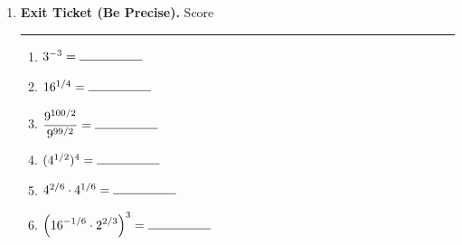 \documentclass[twoside, 10pt]{article}
\begin{document}
\begin{enumerate}
Complete the steps of a proof for the logarithm quotient rule: $\displaystyle \log_b\left(\frac{U}{V}\right) = \log_b{U} - \log_b{V}$. Start with two equations:
\[
b^x = U\hspace{8em}b^y = V
\]
\begin{enumerate}[label = (\roman*)]
\item
Rewrite both of these equations as logarithms.
\begin{align*}
\log_{\rule{2em}{.4pt}}\left(\rule{3em}{0.4pt}\right) &= \rule{4em}{.4pt}\\[1em]
\log_{\rule{2em}{.4pt}}\left(\rule{3em}{0.4pt}\right) &= \rule{4em}{.4pt}
\end{align*}
\item Divide the left sides of the original equations, and set the quotient equal to the quotient of
the right sides of the original equations.
\[
\rule{6em}{0.4pt} = \frac{U}{V}
\]
\item Combine the exponents on the left side of the equation so that it is written with a
single base.
\[
\rule{6em}{0.4pt} = \frac{U}{V}
\]
\item Rewrite the last equation as a logarithm.
\[
\log_{\rule{2em}{.4pt}}\left(\rule{3em}{0.4pt}\right) = \rule{4em}{.4pt}
\]
\item Combine the result in (i) and (iv) to derive the quotient rule of logarithms:\\[1em]
\begin{center}
\rule{20em}{.4pt}
\end{center}
\end{enumerate}
\item {\bf Exit Ticket (Be Precise). } Score \rule{4em}{.4pt}
\begin{enumerate}[itemsep=3em]
\item
$3^{-3} = \rule{5em}{0.4pt}$
\item 
$16^{1/4} = \rule{5em}{0.4pt}$
\item 
$\displaystyle \frac{9^{100/2}}{9^{99/2}} = \rule{5em}{0.4pt}$
\item
$(4^{1/2})^4 = \rule{5em}{0.4pt}$
\item 
$4^{2/6}\cdot4^{1/6} = \rule{5em}{0.4pt}$
\item
$\displaystyle\left(16^{-1/6}\cdot 2^{2/3}\right)^3 = \rule{5em}{0.4pt}$
\end{enumerate}
\clearpage


\end{enumerate}
\end{document}
